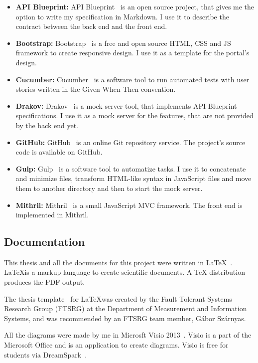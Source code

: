\begin{itemize}
	\item \textbf{API Blueprint:} API Blueprint~\cite{api-blueprint} is an open source project, that gives me the option to write my specification in Markdown. I use it to describe the contract between the back end and the front end.
	\item \textbf{Bootstrap:} Bootstrap~\cite{Bootstrap} is a free and open source HTML, CSS and JS framework to create responsive design. I use it as a template for the portal's design.
	\item \textbf{Cucumber:} Cucumber~\cite{Cucumber} is a software tool to run automated tests with user stories written in the Given When Then convention. 
	\item \textbf{Drakov:} Drakov~\cite{drakov} is a mock server tool, that implements API Blueprint specifications. I use it as a mock server for the features, that are not provided by the back end yet.
	\item \textbf{GitHub:} GitHub~\cite{github} is an online Git repository service. The project's source code is available on GitHub.
	\item \textbf{Gulp:} Gulp~\cite{gulp} is a software tool to automatize tasks. I use it to concatenate and minimize files, transform HTML-like syntax in JavaScript files and move them to another directory and then to start the mock server.
	\item \textbf{Mithril:} Mithril~\cite{Mithril} is a small JavaScript MVC framework. The front end is implemented in Mithril.

\end{itemize}

\subsection{Documentation}

This thesis and all the documents for this project were written in \LaTeX~\cite{latex}. \LaTeX is a markup language to create scientific documents. A TeX distribution produces the PDF output. 

The thesis template~\cite{FTSRG-latex} for \LaTeX was created by the Fault Tolerant Systems Research Group (FTSRG) at the Department of Measurement and Information Systems, and was recommended by an FTSRG team member, Gábor Szárnyas.

All the diagrams were made by me in Microsft Visio 2013~\cite{visio}. Visio is a part of the Microsoft Office and is an application to create diagrams. Visio is free for students via DreamSpark~\cite{msdnaa}.


